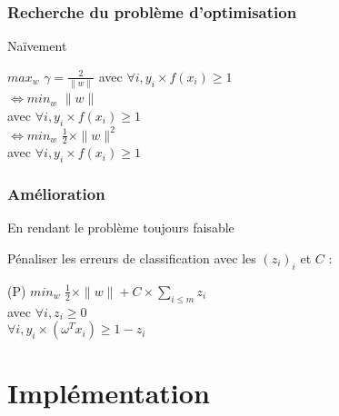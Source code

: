 \documentclass{beamer}
\begin{document}
\begin{frame}
\frametitle{Recherche du problème d'optimisation}

\begin{block}{Naïvement}

      \begin{center}
        $max_{w}$ $\gamma = \frac{2}{\|w\|}$
        avec $\forall i, y_i \times f(x_i) \geq 1$\\

       \bigskip
        $\Leftrightarrow min_{w}$ $\|w\|$ \\
        avec $\forall i, y_i \times f(x_i) \geq 1$\\
       \bigskip
        $\Leftrightarrow min_{w}$ $\frac{1}{2} \times \|w\|^2$\\
        avec $\forall i, y_i \times f(x_i) \geq 1$\\
      \end{center}

\end{block}

\end{frame}

\begin{frame}
\frametitle{Amélioration}

\begin{block}{En rendant le problème toujours faisable}

Pénaliser les erreurs de classification avec les $(z_i)_i$ et $C$ :

           \begin{centre}
           (P) $min_{w}$ $\frac{1}{2} \times \|w\| + C \times \sum_{i \leq m}z_i$\\
           avec $\forall i, z_i \geq 0$\\
           $\forall i, y_i \times (\omega^{T} x_i) \geq 1 - z_i$\\
           \end{centre}

\end{block}

\end{frame}

\section{Implémentation}
\end{document}
